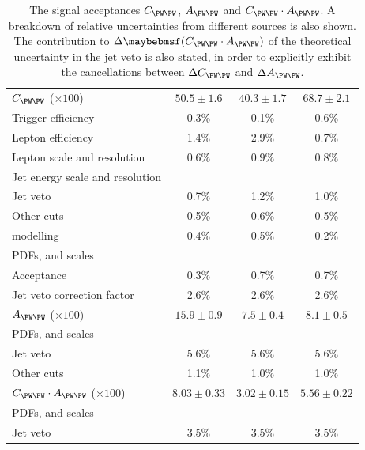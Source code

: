 \begin{table}
	\begin{tabular}{lc@{\hskip 0.3in}c@{\hskip 0.3in}c}
		\toprule
		& \emch & \eech & \mmch \\
		\midrule
		$C_{\WW}$ ($\times 100$) & $50.5\pm1.6$ & $40.3\pm1.7$ & $68.7\pm2.1$ \\
		\quad Trigger efficiency & 0.3\% & 0.1\% & 0.6\% \\
		\quad Lepton efficiency  & 1.4\% & 2.9\% & 0.7\% \\
		\quad Lepton \pt scale and resolution & 0.6\% & 0.9\% & 0.8\% \\
		\quad Jet energy scale and resolution \\
		\quad\quad Jet veto   & 0.7\% & 1.2\% & 1.0\% \\
		\quad\quad Other cuts & 0.5\% & 0.6\% & 0.5\% \\
		\quad \met modelling  & 0.4\% & 0.5\% & 0.2\% \\
		\quad PDFs, \mur and \muf scales \\
		\quad\quad Acceptance & 0.3\% & 0.7\% & 0.7\% \\
		\quad\quad Jet veto correction factor & 2.6\% & 2.6\% & 2.6\% \\
		\cmidrule(lr){1-4}
		$A_{\WW}$ ($\times 100$) & $15.9\pm0.9$ & $7.5\pm0.4$ & $8.1\pm0.5$ \\
		\quad PDFs, \mur and \muf scales \\
		\quad\quad Jet veto   & 5.6\% & 5.6\% & 5.6\% \\
		\quad\quad Other cuts & 1.1\% & 1.0\% & 1.0\% \\
		\cmidrule(lr){1-4}
		$C_{\WW} \cdot A_{\WW}$ ($\times 100$) & $8.03\pm0.33$ & $3.02\pm0.15$ & $5.56\pm0.22$ \\
		\quad PDFs, \mur and \muf scales \\
		\quad\quad Jet veto   & 3.5\% & 3.5\% & 3.5\% \\
		\bottomrule
	\end{tabular}
	\caption{The signal acceptances $C_{\WW}$, $A_{\WW}$ and $C_{\WW} \cdot A_{\WW}$. 
	A breakdown of relative uncertainties from different sources is also shown. The 
	contribution to $\Delta \parenths{C_{\WW} \cdot A_{\WW}}$ of the theoretical 
	uncertainty in the jet veto is also stated, in order to explicitly exhibit the 
	cancellations between $\Delta C_{\WW}$ and $\Delta A_{\WW}$.}
	\label{tab:ww:cww_aww}
\end{table}




